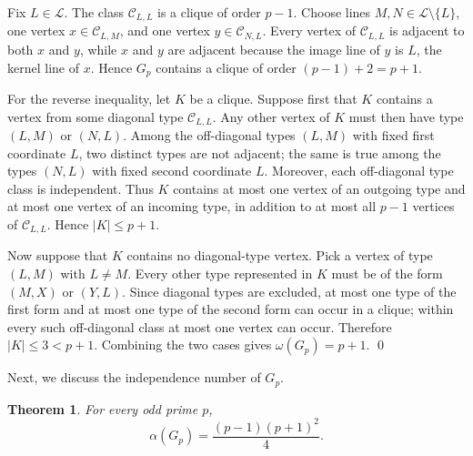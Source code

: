 \documentclass[12pt]{article}
\renewenvironment{proof}{{\bf \noindent Proof.}}{\qed}
\newtheorem{theorem}{Theorem}[section]
\theoremstyle{definition}
\newcommand{\calL}{\mathcal{L}}
\newcommand{\calC}{\mathcal{C}}
\begin{document}
	\begin{proof}
		Fix $L\in\calL$. The class $\calC_{L,L}$ is a clique of order $p-1$. Choose lines $M,N\in\calL\setminus\{L\}$, one vertex $x\in\calC_{L,M}$, and one vertex $y\in\calC_{N,L}$. Every vertex of $\calC_{L,L}$ is adjacent to both $x$ and $y$, while $x$ and $y$ are adjacent because the image line of $y$ is $L$, the kernel line of $x$. Hence $G_p$ contains a clique of order $(p-1)+2=p+1$.
		
		For the reverse inequality, let $K$ be a clique. Suppose first that $K$ contains a vertex from some diagonal type $\calC_{L,L}$. Any other vertex of $K$ must then have type $(L,M)$ or $(N,L)$. Among the off-diagonal types $(L,M)$ with fixed first coordinate $L$, two distinct types are not adjacent; the same is true among the types $(N,L)$ with fixed second coordinate $L$. Moreover, each off-diagonal type class is independent. Thus $K$ contains at most one vertex of an outgoing type and at most one vertex of an incoming type, in addition to at most all $p-1$ vertices of $\calC_{L,L}$. Hence $|K|\le p+1$.
		
		Now suppose that $K$ contains no diagonal-type vertex. Pick a vertex of type $(L,M)$ with $L\neq M$. Every other type represented in $K$ must be of the form $(M,X)$ or $(Y,L)$. Since diagonal types are excluded, at most one type of the first form and at most one type of the second form can occur in a clique; within every such off-diagonal class at most one vertex can occur. Therefore $|K|\le3<p+1$. Combining the two cases gives $\omega(G_p)=p+1$.
	\end{proof}
	
	Next, we discuss the independence number of $G_{p}.$
	\begin{theorem}\label{thm:independenceodd}
		For every odd prime $p$,
		$$
		\alpha(G_p)=\frac{(p-1)(p+1)^2}{4}.
		$$
	\end{theorem}
	
\end{document}
